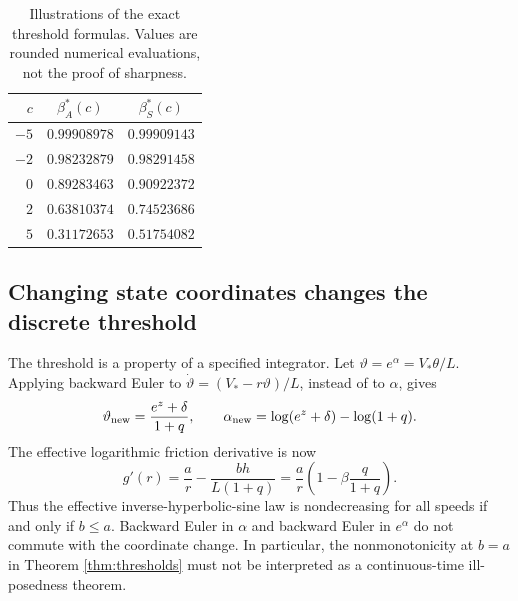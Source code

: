 \documentclass[11pt,a4paper]{article}
\theoremstyle{definition}\newtheorem{definition}[theorem]{Definition}
\theoremstyle{remark}\newtheorem{remark}[theorem]{Remark}
\numberwithin{equation}{section}
\begin{document}
\begin{table}[ht]
\centering
\caption{Illustrations of the exact threshold formulas. Values are rounded numerical evaluations, not the proof of sharpness.}
\begin{tabular}{rcc}
\toprule
$c$ & $\beta_A^*(c)$ & $\beta_S^*(c)$\\\midrule
$-5$ & $0.99908978$ & $0.99909143$\\
$-2$ & $0.98232879$ & $0.98291458$\\
$0$ & $0.89283463$ & $0.90922372$\\
$2$ & $0.63810374$ & $0.74523686$\\
$5$ & $0.31172653$ & $0.51754082$\\\bottomrule
\end{tabular}
\end{table}

\subsection{Changing state coordinates changes the discrete threshold}
The threshold is a property of a specified integrator. Let $\vartheta=e^\alpha=V_*\theta/L$. Applying backward Euler to
$\dot\vartheta=(V_*-r\vartheta)/L$, instead of to $\alpha$, gives
\[
 \vartheta_{\rm new}=\frac{e^z+\delta}{1+q},\qquad
 \alpha_{\rm new}=\log(e^z+\delta)-\log(1+q).
\]
The effective logarithmic friction derivative is now
\begin{equation}\label{eq:thetaEuler}
 g'(r)=\frac ar-\frac{bh}{L(1+q)}
 =\frac ar\left(1-\beta\frac q{1+q}\right).
\end{equation}
Thus the effective inverse-hyperbolic-sine law is nondecreasing for all speeds if and only if $b\le a$. Backward Euler in $\alpha$ and backward Euler in $e^\alpha$ do not commute with the coordinate change. In particular, the nonmonotonicity at $b=a$ in Theorem \ref{thm:thresholds} must not be interpreted as a continuous-time ill-posedness theorem.
\end{document}
